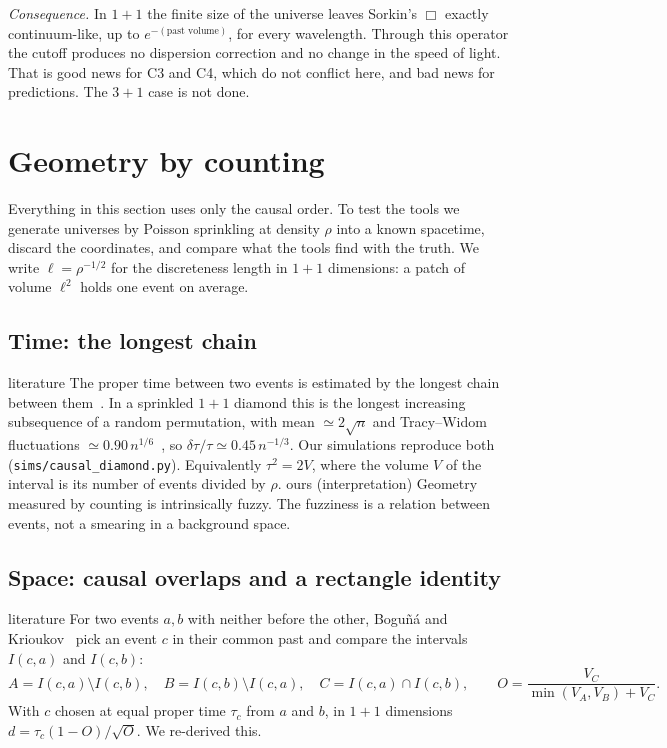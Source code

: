 \documentclass[11pt,a4paper]{article}
\newcommand{\tagbox}[2]{\textsf{\scriptsize\colorbox{#1!12}{\textcolor{#1!70!black}{#2}}}}
\newcommand{\lit}{\tagbox{blue}{literature}}
\newcommand{\ours}{\tagbox{orange}{ours}}
\begin{document}
\emph{Consequence.} In $1+1$ the finite size of the universe leaves Sorkin's $\Box$ exactly continuum-like, up to $e^{-(\text{past volume})}$, for every wavelength. Through this operator the cutoff produces no dispersion correction and no change in the speed of light. That is good news for C3 and C4, which do not conflict here, and bad news for predictions. The $3+1$ case is not done.

\section{Geometry by counting}\label{sec:toolkit}
Everything in this section uses only the causal order. To test the tools we generate universes by Poisson sprinkling at density $\rho$ into a known spacetime, discard the coordinates, and compare what the tools find with the truth. We write $\ell=\rho^{-1/2}$ for the discreteness length in $1+1$ dimensions: a patch of volume $\ell^2$ holds one event on average.

\subsection{Time: the longest chain}
\lit{} The proper time between two events is estimated by the longest chain between them~\cite{BrightwellGregory91}. In a sprinkled $1+1$ diamond this is the longest increasing subsequence of a random permutation, with mean $\simeq2\sqrt n$ and Tracy--Widom fluctuations $\simeq0.90\,n^{1/6}$~\cite{BDJ99}, so $\delta\tau/\tau\simeq0.45\,n^{-1/3}$. Our simulations reproduce both (\texttt{sims/causal\_diamond.py}). Equivalently $\tau^2=2V$, where the volume $V$ of the interval is its number of events divided by $\rho$. \ours{} (interpretation) Geometry measured by counting is intrinsically fuzzy. The fuzziness is a relation between events, not a smearing in a background space.

\subsection{Space: causal overlaps and a rectangle identity}
\lit{} For two events $a,b$ with neither before the other, Boguñá and Krioukov~\cite{BK24} pick an event $c$ in their common past and compare the intervals $I(c,a)$ and $I(c,b)$:
\begin{equation}
A=I(c,a)\setminus I(c,b),\quad B=I(c,b)\setminus I(c,a),\quad C=I(c,a)\cap I(c,b),\qquad O=\frac{V_C}{\min(V_A,V_B)+V_C}.
\end{equation}
With $c$ chosen at equal proper time $\tau_c$ from $a$ and $b$, in $1+1$ dimensions $d=\tau_c(1-O)/\sqrt O$. We re-derived this.
\end{document}
